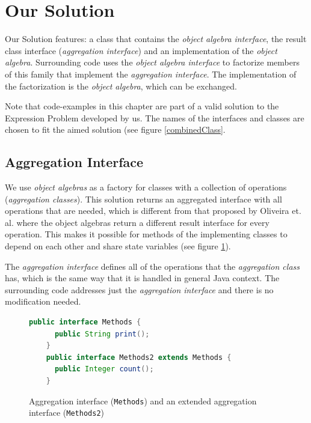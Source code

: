 \documentclass{report}
\begin{document}
\section{Our Solution}

\label{suggestedEPSolution}

Our Solution features: a class that contains the \emph{object algebra interface}, the result class interface (\emph{aggregation interface}) and an implementation of the \emph{object algebra}. Surrounding code uses the \emph{object algebra interface} to factorize members of this family that implement the \emph{aggregation interface}. The implementation of the factorization is the \emph{object algebra}, which can be exchanged.

Note that code-examples in this chapter are part of a valid solution to the Expression Problem developed by us. The names of the interfaces and classes are chosen to fit the aimed solution (see figure \ref{combinedClass}.

\subsection{Aggregation Interface}

We use \emph{object algebras} as a factory for classes with a collection of operations (\emph{aggregation classes}). This solution returns an aggregated interface with all operations that are needed, which is different from that proposed by Oliveira et. al. where the object algebras return a different result interface for every operation. This makes it possible for methods of the implementing classes to depend on each other and share state variables (see figure \ref{aggregationInterfaces}).

The \emph{aggregation interface} defines all of the operations that the \emph{aggregation class} has, which is the same way that it is handled in general Java context. The surrounding code addresses just the \emph{aggregation interface} and there is no modification needed.

\begin{figure}[h]
\begin{lstlisting}[language=java]
    public interface Methods {
      public String print();
    }
    public interface Methods2 extends Methods {
      public Integer count();
    }
\end{lstlisting}
\caption{Aggregation interface (\lstinline{Methods}) and an extended aggregation interface (\lstinline{Methods2})}
\label{aggregationInterfaces}
\end{figure}
\end{document}
